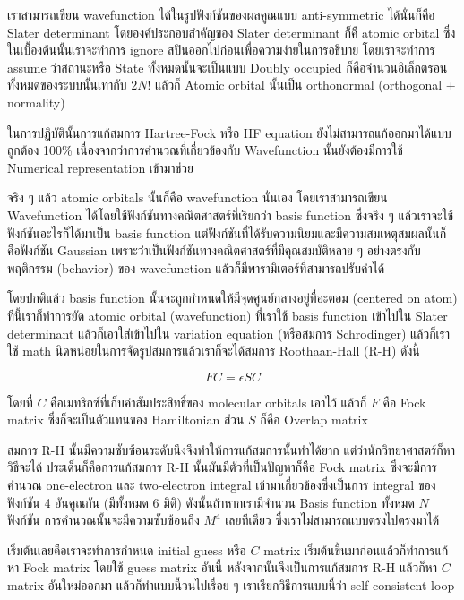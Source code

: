 เราสามารถเขียน wavefunction ได้ในรูปฟังก์ชันของผลคูณแบบ anti-symmetric ได้นั่นก็คือ Slater determinant
โดยองค์ประกอบสำคัญของ Slater determinant ก็คื atomic orbital ซึ่งในเบื้องต้นนั้นเราจะทำการ ignore
สปินออกไปก่อนเพื่อความง่ายในการอธิบาย โดยเราจะทำการ assume ว่าสถานะหรือ State ทั้งหมดนั้นจะเป็นแบบ
Doubly occupied ก็คือจำนวนอิเล็กตรอนทั้งหมดของระบบนั้นเท่ากับ $2N!$ แล้วก็ Atomic orbital
นั้นเป็น orthonormal (orthogonal + normality)

ในการปฏิบัตินั้นการแก้สมการ Hartree-Fock หรือ HF equation ยังไม่สามารถแก้ออกมาได้แบบถูกต้อง 100\%
เนื่องจากว่าการคำนวณที่เกี่ยวข้องกับ Wavefunction นั้นยังต้องมีการใช้ Numerical representation เข้ามาช่วย

จริง ๆ แล้ว atomic orbitals นั้นก็คือ wavefunction นั่นเอง โดยเราสามารถเขียน Wavefunction
ได้โดยใช้ฟังก์ชันทางคณิตศาสตร์ที่เรียกว่า basis function ซึ่งจริง ๆ แล้วเราจะใช้ฟังก์ชันอะไรก็ได้มาเป็น
basis function แต่ฟังก์ชันที่ได้รับความนิยมและมีความสมเหตุสมผลนั้นก็คือฟังก์ชัน Gaussian
เพราะว่าเป็นฟังก์ชันทางคณิตศาสตร์ที่มีคุณสมบัติหลาย ๆ อย่างตรงกับพฤติกรรม (behavior) ของ wavefunction
แล้วก็มีพารามิเตอร์ที่สามารถปรับค่าได้

โดยปกติแล้ว basis function นั้นจะถูกกำหนดให้มีจุดศูนย์กลางอยู่ที่อะตอม (centered on atom)
ทีนี้เราก็ทำการยัด atomic orbital (wavefunction) ที่เราใช้ basis function เข้าไปใน Slater
determinant แล้วก็เอาใส่เข้าไปใน variation equation (หรือสมการ Schrodinger)
แล้วก็เราใช้ math นิดหน่อยในการจัดรูปสมการแล้วเราก็จะได้สมการ Roothaan-Hall (R-H) ดังนี้

\begin{equation}
    FC = \epsilon SC
\end{equation}

โดยที่ $C$ คือเมทริกซ์ที่เก็บค่าสัมประสิทธิ์ของ molecular orbitals เอาไว้ แล้วก็ $F$ คือ Fock matrix
ซึ่งก็จะเป็นตัวแทนของ Hamiltonian ส่วน $S$ ก็คือ Overlap matrix

สมการ R-H นั้นมีความซับซ้อนระดับนึงจึงทำให้การแก้สมการนั้นทำได้ยาก แต่ว่านักวิทยาศาสตร์ก็หาวิธีจะได้
ประเด็นก็คือการแก้สมการ R-H นั้นมันมีตัวที่เป็นปัญหาก็คือ Fock matrix ซึ่งจะมีการคำนวณ one-electron
และ two-electron integral เข้ามาเกี่ยวข้องซึ่งเป็นการ integral ของฟังก์ชัน 4 อันคูณกัน
(มีทั้งหมด 6 มิติ) ดังนั้นถ้าหากเรามีจำนวน Basis function ทั้งหมด $N$ ฟังก์ชัน
การคำนวณนั้นจะมีความซับซ้อนถึง $M^{4}$ เลยทีเดียว ซึ่งเราไม่สามารถแบบตรงไปตรงมาได้

เริ่มต้นเลยคือเราจะทำการกำหนด initial guess หรือ $C$ matrix เริ่มต้นขึ้นมาก่อนแล้วก็ทำการแก้หา
Fock matrix โดยใช้ guess matrix อันนี้ หลังจากนั้นจึงเป็นการแก้สมการ R-H แล้วก็หา $C$ matrix
อันใหม่ออกมา แล้วก็ทำแบบนี้วนไปเรื่อย ๆ เราเรียกวิธีการแบบนี้ว่า self-consistent loop

